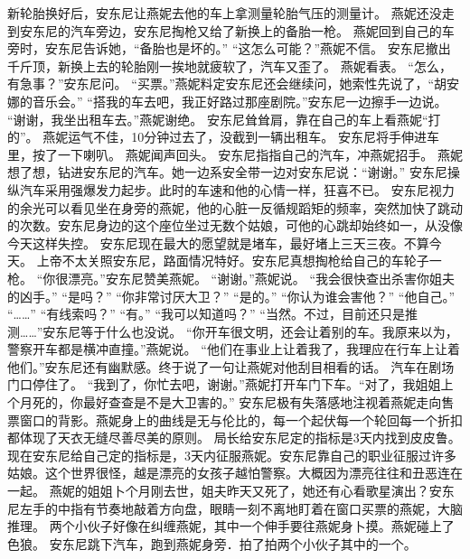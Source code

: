 \documentclass[a4paper,12pt,UTF8,twoside]{ctexbook}
\begin{document}
        新轮胎换好后，安东尼让燕妮去他的车上拿测量轮胎气压的测量计。 
        燕妮还没走到安东尼的汽车旁边，安东尼掏枪又给了新换上的备胎一枪。 
        燕妮回到自己的车旁时，安东尼告诉她，“备胎也是坏的。” 
        “这怎么可能？”燕妮不信。 
        安东尼撤出千斤顶，新换上去的轮胎刚一挨地就疲软了，汽车又歪了。 
        燕妮看表。 
        “怎么，有急事？”安东尼问。 
        “买票。”燕妮料定安东尼还会继续问，她索性先说了，“胡安娜的音乐会。” 
        “搭我的车去吧，我正好路过那座剧院。”安东尼一边擦手一边说。 
        “谢谢，我坐出租车去。”燕妮谢绝。 
        安东尼耸耸肩，靠在自己的车上看燕妮“打的”。 
        燕妮运气不佳，10分钟过去了，没截到一辆出租车。 
        安东尼将手伸进车里，按了一下喇叭。 
        燕妮闻声回头。 
        安东尼指指自己的汽车，冲燕妮招手。 
        燕妮想了想，钻进安东尼的汽车。她一边系安全带一边对安东尼说：“谢谢。” 
        安东尼操纵汽车采用强爆发力起步。此时的车速和他的心情一样，狂喜不已。 
        安东尼视力的余光可以看见坐在身旁的燕妮，他的心脏一反循规蹈矩的频率，突然加快了跳动的次数。安东尼身边的这个座位坐过无数个姑娘，可他的心跳却始终如一，从没像今天这样失控。 
        安东尼现在最大的愿望就是堵车，最好堵上三天三夜。不算今天。 
        上帝不太关照安东尼，路面情况特好。安东尼真想掏枪给自己的车轮子一枪。 
        “你很漂亮。”安东尼赞美燕妮。 
        “谢谢。”燕妮说。 
        “我会很快查出杀害你姐夫的凶手。” 
        “是吗？” 
        “你非常讨厌大卫？” 
        “是的。” 
        “你认为谁会害他？” 
        “他自己。” 
        “……” 
        “有线索吗？” 
        “有。” 
        “我可以知道吗？” 
        “当然。不过，目前还只是推测……”安东尼等于什么也没说。 
        “你开车很文明，还会让着别的车。我原来以为，警察开车都是横冲直撞。”燕妮说。 
        “他们在事业上让着我了，我理应在行车上让着他们。”安东尼还有幽默感。终于说了一句让燕妮对他刮目相看的话。 
        汽车在剧场门口停住了。 
        “我到了，你忙去吧，谢谢。”燕妮打开车门下车。“对了，我姐姐上个月死的，你最好查查是不是大卫害的。” 
        安东尼极有失落感地注视着燕妮走向售票窗口的背影。燕妮身上的曲线是无与伦比的，每一个起伏每一个轮回每一个折扣都体现了天衣无缝尽善尽美的原则。 
        局长给安东尼定的指标是3天内找到皮皮鲁。 
        现在安东尼给自己定的指标是，3天内征服燕妮。安东尼靠自己的职业征服过许多姑娘。这个世界很怪，越是漂亮的女孩子越怕警察。大概因为漂亮往往和丑恶连在一起。 
        燕妮的姐姐卜个月刚去世，姐夫昨天又死了，她还有心看歌星演出？安东尼左手的中指有节奏地敲着方向盘，眼睛一刻不离地盯着在窗口买票的燕妮，大脑推理。 
        两个小伙子好像在纠缠燕妮，其中一个伸手要往燕妮身卜摸。燕妮碰上了色狼。 
        安东尼跳下汽车，跑到燕妮身旁．拍了拍两个小伙子其中的一个。 
\end{document}
